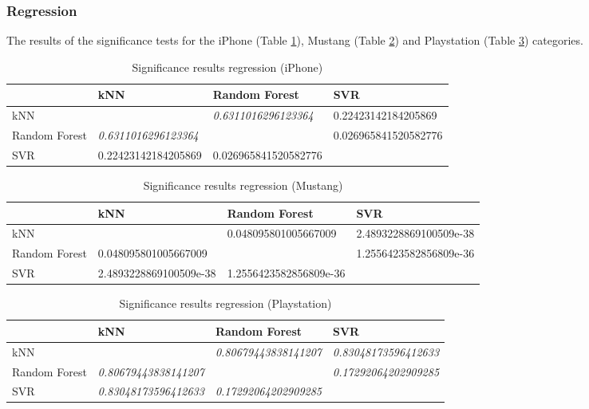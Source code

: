 \subsubsection{Regression}
The results of the significance tests for the iPhone (Table \ref{tab_sig_reg_iphone}), Mustang (Table \ref{tab_sig_reg_mustang}) and Playstation (Table \ref{tab_sig_reg_playstation}) categories.
\begin{table}[h]
	\begin{center}
	\begin{tabular}{| p{2.65cm} || p{3.45cm} | p{3.45cm} | p{3.45cm} |}
		\hline
		& kNN & Random Forest & SVR \\
		\hline \hline
		kNN & & \textit{0.6311016296123364} & 0.22423142184205869 \\
		\hline
		Random Forest & \textit{0.6311016296123364} & & 0.026965841520582776 \\
		\hline
		SVR & 0.22423142184205869 & 0.026965841520582776 & \\
		\hline
	\end{tabular}
	\end{center}
	\caption{Significance results regression (iPhone)}
	\label{tab_sig_reg_iphone}
\end{table}
\begin{table}[h]
	\begin{center}
	\begin{tabular}{| p{2.65cm} || p{3.45cm} | p{3.45cm} | p{3.45cm} |}
		\hline
		& kNN & Random Forest & SVR \\
		\hline \hline
		kNN & & 0.048095801005667009 & 2.4893228869100509e-38 \\
		\hline
		Random Forest & 0.048095801005667009 & & 1.2556423582856809e-36 \\
		\hline
		SVR & 2.4893228869100509e-38 & 1.2556423582856809e-36 & \\
		\hline
	\end{tabular}
	\end{center}
	\caption{Significance results regression (Mustang)}
	\label{tab_sig_reg_mustang}
\end{table}
\begin{table}[h]
	\begin{center}
	\begin{tabular}{| p{2.65cm} || p{3.45cm} | p{3.45cm} | p{3.45cm} |}
		\hline
		& kNN & Random Forest & SVR \\
		\hline \hline
		kNN & & \textit{0.80679443838141207} & \textit{0.83048173596412633} \\
		\hline
		Random Forest & \textit{0.80679443838141207} & & \textit{0.17292064202909285} \\
		\hline
		SVR & \textit{0.83048173596412633} & \textit{0.17292064202909285} & \\
		\hline
	\end{tabular}
	\end{center}
	\caption{Significance results regression (Playstation)}
	\label{tab_sig_reg_playstation}
\end{table}
